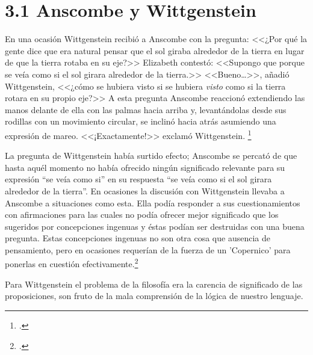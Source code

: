 
\section{3.1 Anscombe y Wittgenstein}

En una ocasión Wittgenstein
recibió a Anscombe con la pregunta: <<¿Por qué la gente dice que era natural
pensar que el sol giraba alrededor de la tierra en lugar de que la tierra rotaba
en su eje?>> Elizabeth contestó: <<Supongo que porque se veía como si el sol
girara alrededor de la tierra.>> <<Bueno\ldots>>, añadió Wittgenstein, <<¿cómo
se hubiera visto si se hubiera \emph{visto} como si la tierra rotara en su
propio eje?>> A esta pregunta Anscombe reaccionó extendiendo las manos delante
de ella con las palmas hacia arriba y, levantándolas desde sus rodillas con un
movimiento circular, se inclinó hacia atrás asumiendo una expresión de mareo.
<<¡Exactamente!>> exclamó Wittgenstein. \footcite[cf.][151]{IWT} 


La pregunta de Wittgenstein había
surtido efecto; Anscombe se percató de que hasta aquél momento no había ofrecido
ningún significado relevante para su expresión ``se veía como si'' en su
respuesta ``se veía como si el sol girara alrededor de la tierra''. En ocasiones
la discusión con Wittgenstein llevaba a Anscombe a situaciones como esta. Ella
podía responder a sus cuestionamientos con afirmaciones para las cuales no podía
ofrecer mejor significado que los sugeridos por concepciones ingenuas y éstas
podían ser destruidas con una buena pregunta. Estas concepciones ingenuas no son
otra cosa que ausencia de pensamiento, pero en ocasiones requerían de la fuerza
de un 'Copernico' para ponerlas en cuestión efectivamente.\footcite[cf.
151]{IWT}



Para Wittgenstein el problema de la
filosofía era la carencia de significado de las proposiciones, son fruto de la
mala comprensión de la lógica de nuestro lenguaje.

